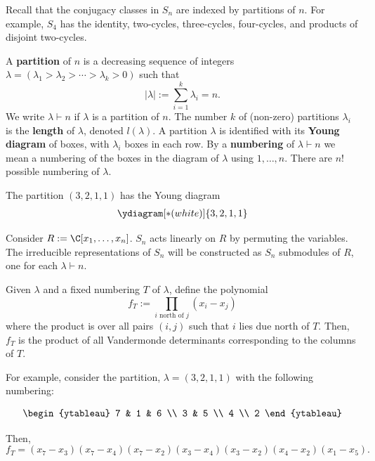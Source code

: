 Recall that the conjugacy classes in $S_n$ are indexed by partitions of $n$. For example, $S_4$ has the identity, two-cycles, three-cycles, four-cycles, and products of disjoint two-cycles.

\begin{defn}
    A \textbf{partition} of $n$ is a decreasing sequence of integers $\lambda=(\lambda_1>\lambda_2>\cdots>\lambda_k>0)$ such that
    $$|\lambda| := \sum_{i=1}^k\lambda _i=n.$$
    We write $\lambda \vdash n$ if $\lambda$ is a partition of $n$. The number $k$ of (non-zero) partitions $\lambda_i$ is the \textbf{length} of $\lambda$, denoted $l(\lambda)$. A partition $\lambda$ is identified with its \textbf{Young diagram} of boxes, with $\lambda_i$ boxes in each row. By a \textbf{numbering} of $\lambda \vdash n$ we mean a numbering of the boxes in the diagram of $\lambda$ using $1,\dots,n$. There are $n!$ possible numbering of $\lambda$.
\end{defn}

\begin{ex}
The partition $(3,2,1,1)$ has the Young diagram
\begin{align*}
    \ydiagram[*(white)]{3,2,1,1}
\end{align*}
\end{ex}

Consider $R:= \C[x_1,\dots,x_n]$. $S_n$ acts linearly on $R$ by permuting the variables. The irreducible representations of $S_n$ will be constructed as $S_n$ submodules of $R$, one for each $\lambda \vdash n$.

Given $\lambda$ and a fixed numbering $T$ of $\lambda$, define the polynomial
$$f_T:= \prod _{i\text{ north of } j}(x_i-x_j)$$
where the product is over all pairs $(i,j)$ such that $i$ lies due north of $T$. Then, $f_T$ is the product of all Vandermonde determinants corresponding to the columns of $T$.

For example, consider the partition, $\lambda=(3,2,1,1)$ with the following numbering:

\begin{align*}
\begin{ytableau}
7 & 1 & 6 \\
3 & 5  \\
4 \\ 2
\end{ytableau}
\end{align*}

Then,
$$f_T =(x_7-x_3)(x_7-x_4)(x_7-x_2)(x_3-x_4)(x_3-x_2)(x_4-x_2)(x_1-x_5).$$

